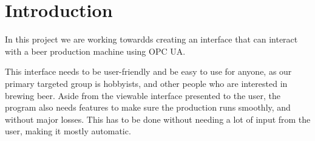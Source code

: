 \section{Introduction}

In this project we are working towardds creating an interface that can interact with a beer production machine using OPC UA. \newline

\noindent This interface needs to be user-friendly and be easy to use for anyone, as our primary targeted group is hobbyists, and other people who are interested in brewing beer. \newline
Aside from the viewable interface presented to the user, the program also needs features to make sure the production runs smoothly, and without major losses. \newline
This has to be done without needing a lot of input from the user, making it mostly automatic. \newline
